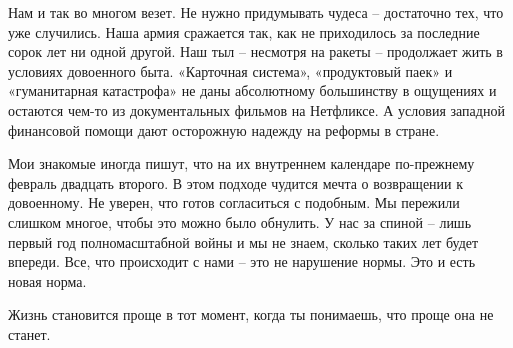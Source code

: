 Нам и так во многом везет. Не нужно придумывать чудеса – достаточно тех, что
уже случились. Наша армия сражается так, как не приходилось за последние сорок
лет ни одной другой. Наш тыл – несмотря на ракеты – продолжает жить в условиях
довоенного быта. «Карточная система», «продуктовый паек» и «гуманитарная
катастрофа» не даны абсолютному большинству в ощущениях и остаются чем-то из
документальных фильмов на Нетфликсе. А условия западной финансовой помощи дают
осторожную надежду на реформы в стране. 

Мои знакомые иногда пишут, что на их внутреннем календаре по-прежнему февраль
двадцать второго. В этом подходе чудится мечта о возвращении к довоенному. Не
уверен, что готов согласиться с подобным. Мы пережили слишком многое, чтобы это
можно было обнулить. У нас за спиной – лишь первый год полномасштабной войны и
мы не знаем, сколько таких лет будет впереди. Все, что происходит с нами – это
не нарушение нормы. Это и есть новая норма. 

Жизнь становится проще в тот момент, когда ты понимаешь, что проще она не
станет.
